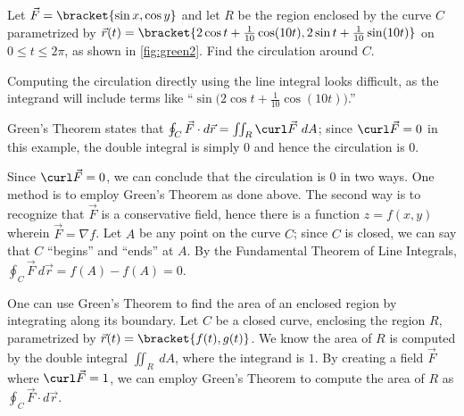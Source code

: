 
{Let $\vec F =\bracket{\sin x,\cos y}$ and let $R$ be the region enclosed by the curve $C$ parametrized by $\vec r(t) =\bracket{2\cos t+ \frac1{10}\cos(10t),2\sin t+\frac1{10}\sin(10t)}$ on $0\leq t\leq 2\pi$, as shown in \autoref{fig:green2}. Find the circulation around $C$.}
{Computing the circulation directly using the line integral looks difficult, as the integrand will include terms like ``$\sin\big(2\cos t + \frac1{10}\cos(10t)\big)$.'' 

Green's Theorem states that $\oint_C\vec F\cdot d\vec r = \iint_R \curl\vec F\ dA$; since $\curl \vec F = 0$ in this example, the double integral is simply 0 and hence the circulation is 0.

Since $\curl \vec F = 0$, we can conclude that the circulation is 0 in two ways. One method is to employ Green's Theorem as done above. The second way is to recognize that $\vec F$ is a conservative field, hence there is a function $z=f(x,y)$ wherein $\vec F = \nabla f$. Let $A$ be any point on the curve $C$; since $C$ is closed, we can say that $C$ ``begins'' and ``ends'' at $A$. By the Fundamental Theorem of Line Integrals, $\oint_C \vec F\ d\vec r = f(A)-f(A) = 0$.}

One can use Green's Theorem to find the area of an enclosed region by integrating along its boundary. Let $C$ be a closed curve, enclosing the region $R$, parametrized by $\vec r(t) =\bracket{f(t),g(t)}$. We know the area of $R$ is computed by the double integral $\iint_R \ dA$, where the integrand is $1$. By creating a field $\vec F$ where $\curl \vec F =1$, we can employ Green's Theorem to compute the area of $R$ as $\oint_C \vec F\cdot d\vec r$. 

